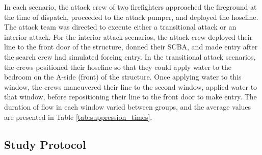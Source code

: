 \documentclass[12pt,oneside]{article}
\begin{document}
In each scenario, the attack crew of two firefighters approached the fireground at the time of dispatch, proceeded to the attack pumper, and deployed the hoseline. The attack team was directed to execute either a transitional attack or an interior attack. For the interior attack scenarios, the attack crew deployed their line to the front door of the structure, donned their SCBA, and made entry after the search crew had simulated forcing entry. In  the transitional attack scenarios, the crews positioned their hoseline so that they could apply water to the bedroom on the A-side (front) of the structure. Once applying water to this window, the crews maneuvered their line to the second window, applied water to that window, before repositioning their line to the front door to make entry. The duration of flow in each window varied between groups, and the average values are presented in Table \ref{tab:suppression_times}. 

\subsection{Study Protocol}
\end{document}
